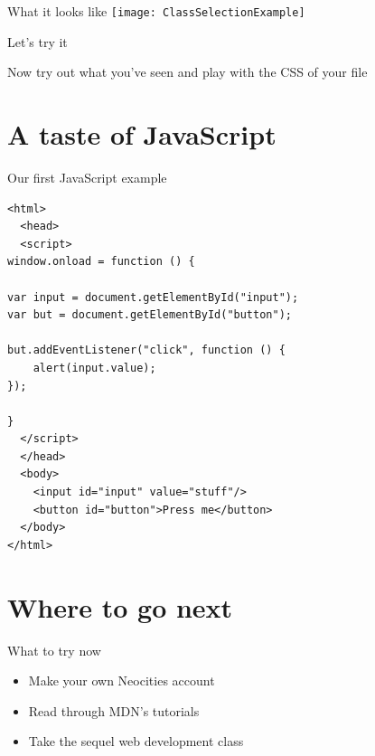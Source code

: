 \documentclass[notes]{beamer}
\begin{document}
\begin{frame}{What it looks like}
  \texttt{[image: ClassSelectionExample]}
\end{frame}


\begin{frame}{Let's try it}
  \begin{block}{}
    Now try out what you've seen and play with the CSS of your file
  \end{block}
\end{frame}

\section{A taste of JavaScript}
\begin{frame}[fragile]{Our first JavaScript example}
  \begin{verbatim}
<html>
  <head>
  <script>
window.onload = function () {

var input = document.getElementById("input");
var but = document.getElementById("button");

but.addEventListener("click", function () {
    alert(input.value);
});

}
  </script>
  </head>
  <body>
    <input id="input" value="stuff"/>
    <button id="button">Press me</button>
  </body>
</html>
  \end{verbatim}
\end{frame}

\section{Where to go next}
\begin{frame}{What to try now}
  \begin{block}{}
    \begin{itemize}
      \item Make your own Neocities account
      \item Read through MDN's tutorials
      \item Take the sequel web development class
    \end{itemize}
  \end{block}
\end{frame}
\end{document}
